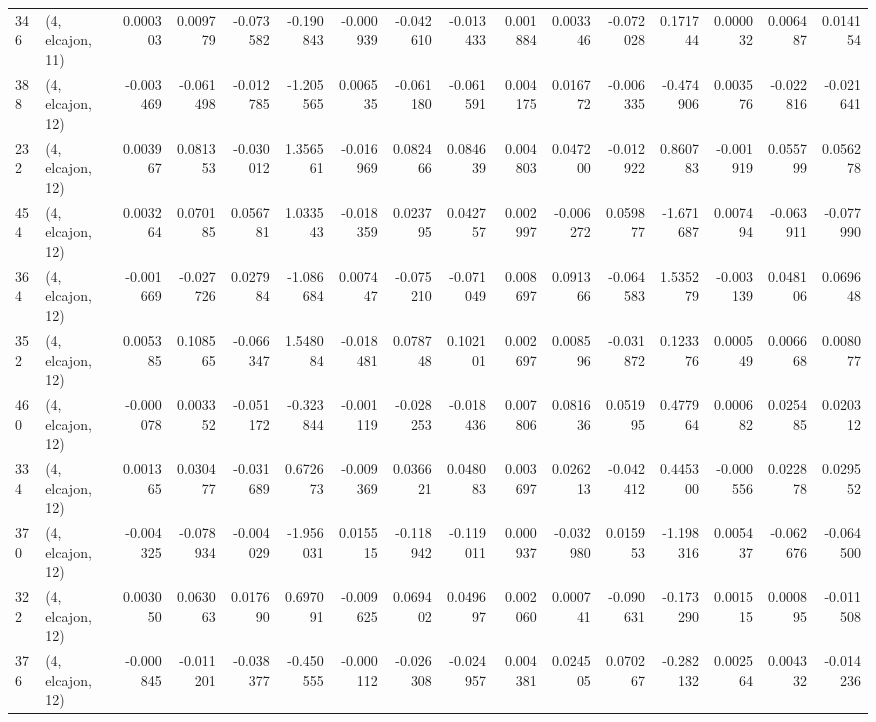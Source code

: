\begin{tabular}{llrrrrrrrrrrrrrr}
346 &  (4, elcajon, 11) &   0.000303 &  0.009779 & -0.073582 &    -0.190843 &  -0.000939 &  -0.042610 &  -0.013433 &  0.001884 &  0.003346 & -0.072028 &    0.171744 &  0.000032 &  0.006487 &  0.014154 \\
388 &  (4, elcajon, 12) &  -0.003469 & -0.061498 & -0.012785 &    -1.205565 &   0.006535 &  -0.061180 &  -0.061591 &  0.004175 &  0.016772 & -0.006335 &   -0.474906 &  0.003576 & -0.022816 & -0.021641 \\
232 &  (4, elcajon, 12) &   0.003967 &  0.081353 & -0.030012 &     1.356561 &  -0.016969 &   0.082466 &   0.084639 &  0.004803 &  0.047200 & -0.012922 &    0.860783 & -0.001919 &  0.055799 &  0.056278 \\
454 &  (4, elcajon, 12) &   0.003264 &  0.070185 &  0.056781 &     1.033543 &  -0.018359 &   0.023795 &   0.042757 &  0.002997 & -0.006272 &  0.059877 &   -1.671687 &  0.007494 & -0.063911 & -0.077990 \\
364 &  (4, elcajon, 12) &  -0.001669 & -0.027726 &  0.027984 &    -1.086684 &   0.007447 &  -0.075210 &  -0.071049 &  0.008697 &  0.091366 & -0.064583 &    1.535279 & -0.003139 &  0.048106 &  0.069648 \\
352 &  (4, elcajon, 12) &   0.005385 &  0.108565 & -0.066347 &     1.548084 &  -0.018481 &   0.078748 &   0.102101 &  0.002697 &  0.008596 & -0.031872 &    0.123376 &  0.000549 &  0.006668 &  0.008077 \\
460 &  (4, elcajon, 12) &  -0.000078 &  0.003352 & -0.051172 &    -0.323844 &  -0.001119 &  -0.028253 &  -0.018436 &  0.007806 &  0.081636 &  0.051995 &    0.477964 &  0.000682 &  0.025485 &  0.020312 \\
334 &  (4, elcajon, 12) &   0.001365 &  0.030477 & -0.031689 &     0.672673 &  -0.009369 &   0.036621 &   0.048083 &  0.003697 &  0.026213 & -0.042412 &    0.445300 & -0.000556 &  0.022878 &  0.029552 \\
370 &  (4, elcajon, 12) &  -0.004325 & -0.078934 & -0.004029 &    -1.956031 &   0.015515 &  -0.118942 &  -0.119011 &  0.000937 & -0.032980 &  0.015953 &   -1.198316 &  0.005437 & -0.062676 & -0.064500 \\
322 &  (4, elcajon, 12) &   0.003050 &  0.063063 &  0.017690 &     0.697091 &  -0.009625 &   0.069402 &   0.049697 &  0.002060 &  0.000741 & -0.090631 &   -0.173290 &  0.001515 &  0.000895 & -0.011508 \\
376 &  (4, elcajon, 12) &  -0.000845 & -0.011201 & -0.038377 &    -0.450555 &  -0.000112 &  -0.026308 &  -0.024957 &  0.004381 &  0.024505 &  0.070267 &   -0.282132 &  0.002564 &  0.004332 & -0.014236 \\

\end{tabular}
